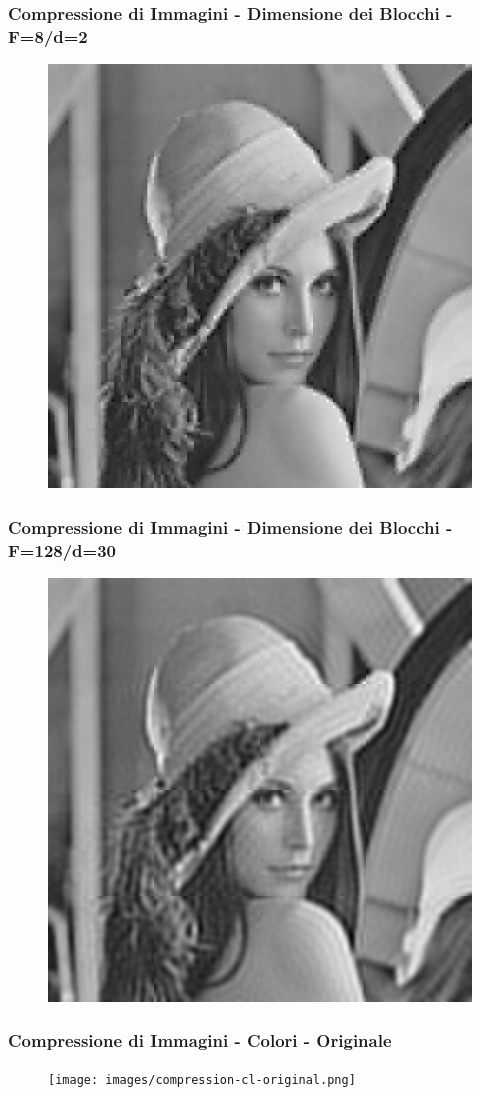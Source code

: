 \documentclass{beamer}
\begin{document}
\begin{frame}
\frametitle{Compressione di Immagini - Dimensione dei Blocchi - F=8/d=2}
\begin{figure}
  \centering
  \includegraphics[width=0.58\linewidth]{images/compression-gb-F8-d2.png}
\end{figure}
\end{frame}

\begin{frame}
\frametitle{Compressione di Immagini - Dimensione dei Blocchi - F=128/d=30}
\begin{figure}
  \centering
  \includegraphics[width=0.58\linewidth]{images/compression-gb-F128-d30.png}
\end{figure}
\end{frame}

\begin{frame}
\frametitle{Compressione di Immagini - Colori - Originale}
\begin{figure}
  \centering
  \texttt{[image: images/compression-cl-original.png]}
\end{figure}
\end{frame}
\end{document}
